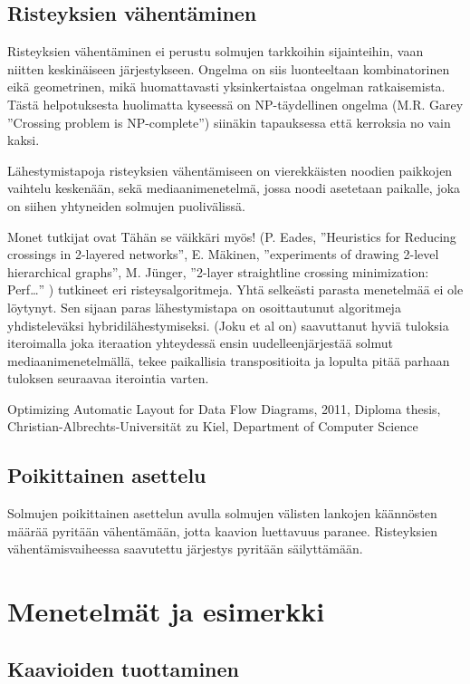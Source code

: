 \documentclass[finnish,12pt]{article}
\begin{document}
		\subsection{Risteyksien vähentäminen}

Risteyksien vähentäminen ei perustu solmujen tarkkoihin sijainteihin, vaan niitten keskinäiseen järjestykseen.
Ongelma on siis luonteeltaan kombinatorinen eikä geometrinen, mikä huomattavasti yksinkertaistaa ongelman ratkaisemista. 
Tästä helpotuksesta huolimatta kyseessä on NP-täydellinen ongelma (M.R. Garey ”Crossing problem is NP-complete”) siinäkin tapauksessa että kerroksia no vain kaksi.

Lähestymistapoja risteyksien vähentämiseen on vierekkäisten noodien paikkojen vaihtelu keskenään, sekä mediaanimenetelmä, jossa noodi asetetaan paikalle, joka on siihen yhtyneiden solmujen puolivälissä.

Monet tutkijat ovat Tähän se väikkäri myös! (P. Eades, ”Heuristics for Reducing crossings in 2-layered networks”, E. Mäkinen, ”experiments of drawing 2-level hierarchical graphs”, M. Jünger, ”2-layer straightline crossing minimization: Perf…” ) tutkineet eri risteysalgoritmeja. Yhtä selkeästi parasta menetelmää ei ole löytynyt. Sen sijaan paras lähestymistapa on osoittautunut algoritmeja yhdisteleväksi hybridilähestymiseksi.
(Joku et al on) saavuttanut hyviä tuloksia iteroimalla joka iteraation yhteydessä ensin uudelleenjärjestää solmut mediaanimenetelmällä, tekee paikallisia transpositioita ja lopulta pitää parhaan tuloksen seuraavaa iterointia varten.


Optimizing Automatic Layout for Data Flow Diagrams, 2011, Diploma thesis, Christian-Albrechts-Universität zu Kiel, Department of Computer Science

		\subsection{Poikittainen asettelu}

Solmujen poikittainen asettelun avulla solmujen välisten lankojen käännösten määrää pyritään vähentämään, jotta kaavion luettavuus paranee. Risteyksien vähentämisvaiheessa saavutettu järjestys pyritään säilyttämään.



	\clearpage
	\section{Menetelmät ja esimerkki}
		\subsection{Kaavioiden tuottaminen}
\end{document}
